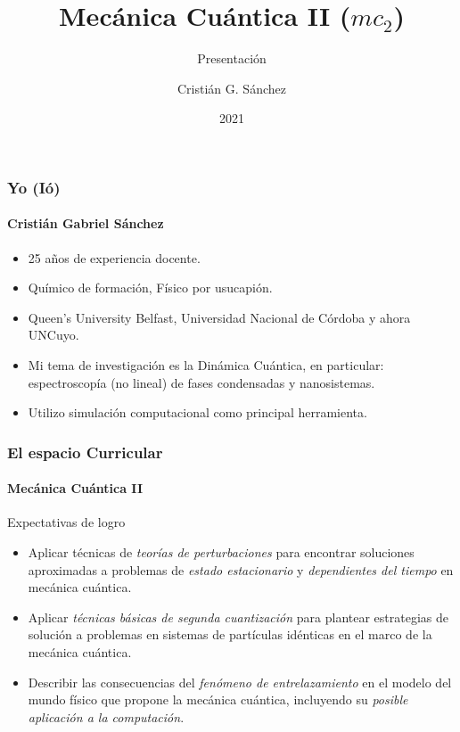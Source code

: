 \documentclass{beamer}
\title{Mecánica Cuántica II ($mc_2$)}
\subtitle{Presentación}
\author{Cristián G. Sánchez}
\institute{Facultad de Ciencias Exactas y Naturales - UNCuyo\\
        Instituto Interdisciplinario de Ciencias Básicas - CONICET}
\date{2021}
\begin{document}
\frame{\titlepage}

\begin{frame}
\frametitle{Yo (Ió)}
\framesubtitle{Cristián Gabriel Sánchez}

\begin{itemize}
    \item 25 años de experiencia docente.
    \item Químico de formación, Físico por usucapión.
    \item Queen's University Belfast, Universidad Nacional de Córdoba y ahora UNCuyo.
    \item Mi tema de investigación es la Dinámica Cuántica, en particular:
    espectroscopía (no lineal) de fases condensadas y nanosistemas.
    \item Utilizo simulación computacional como principal herramienta.
\end{itemize}

\end{frame}

\begin{frame}
    \frametitle{El espacio Curricular}
    \framesubtitle{Mecánica Cuántica II}

\begin{block}{Expectativas de logro}
    \begin{itemize}
        \item Aplicar técnicas de {\em \color{blue} teorías de perturbaciones} para encontrar    
            soluciones aproximadas a problemas de {\em \color{blue}  estado estacionario} y     
            {\em \color{blue}  dependientes del tiempo} en mecánica cuántica. \pause
        \item Aplicar {\em \color{blue}  técnicas básicas de segunda cuantización} para plantear   
             estrategias de solución a problemas en sistemas de partículas    
             idénticas en el marco de la mecánica cuántica. \pause
        \item Describir las consecuencias del {\em \color{blue}  fenómeno de entrelazamiento} en   
             el modelo del mundo físico que propone la mecánica cuántica,     
             incluyendo su {\em \color{blue} posible aplicación a la computación}.  
    \end{itemize}
\end{block}
    
\end{frame}
\end{document}
